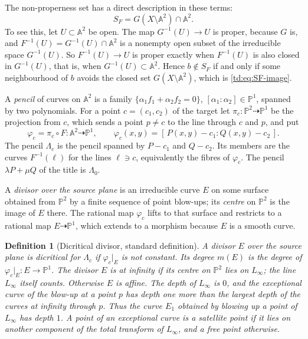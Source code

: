 \documentclass[a4paper,11pt]{article}
\theoremstyle{jsplain}
\theoremstyle{jsdef}
\newtheorem{definition}[theorem]{Definition}
\theoremstyle{jsrem}
\begin{document}
The non-properness set has a direct description in these terms:
\begin{equation}\label{td:eq:SF-image}
S_F = G(X \setminus \mathbb{A}^2) \cap \mathbb{A}^2 .
\end{equation}
To see this, let $U \subset \mathbb{A}^2$ be open. The map $G^{-1}(U) \to U$ is proper, because
$G$ is, and $F^{-1}(U) = G^{-1}(U) \cap \mathbb{A}^2$ is a nonempty open subset of the
irreducible space $G^{-1}(U)$. So $F^{-1}(U) \to U$ is proper exactly when $F^{-1}(U)$ is also
closed in $G^{-1}(U)$, that is, when $G^{-1}(U) \subset \mathbb{A}^2$. Hence $b \notin S_F$ if and
only if some neighbourhood of $b$ avoids the closed set $G(X \setminus \mathbb{A}^2)$, which is
\eqref{td:eq:SF-image}.

A \emph{pencil} of curves on $\mathbb{A}^2$ is a family $\{\alpha_1 f_1 + \alpha_2 f_2 = 0\}$,
$[\alpha_1 : \alpha_2] \in \mathbb{P}^1$, spanned by two polynomials. For a point
$c = (c_1, c_2)$ of the target let $\pi_c \colon \mathbb{P}^2 \dashrightarrow \mathbb{P}^1$ be
the projection from $c$, which sends a point $p \neq c$ to the line through $c$ and $p$, and put
\[
\varphi_c = \pi_c \circ F \colon \mathbb{A}^2 \dashrightarrow \mathbb{P}^1, \qquad
\varphi_c(x,y) = [\,P(x,y) - c_1 : Q(x,y) - c_2\,].
\]
The pencil $\Lambda_c$ is the pencil spanned by $P - c_1$ and $Q - c_2$. Its members are the
curves $F^{-1}(\ell)$ for the lines $\ell \ni c$, equivalently the fibres of $\varphi_c$. The
pencil $\lambda P + \mu Q$ of the title is $\Lambda_0$.

A \emph{divisor over the source plane} is an irreducible curve $E$ on some surface obtained from
$\mathbb{P}^2$ by a finite sequence of point blow-ups; its \emph{centre} on $\mathbb{P}^2$ is the
image of $E$ there. The rational map $\varphi_c$ lifts to that surface and restricts to a
rational map $E \dashrightarrow \mathbb{P}^1$, which extends to a morphism because $E$ is a
smooth curve.

\begin{definition}[Dicritical divisor, standard definition]\label{td:def:dicritical}
A divisor $E$ over the source plane is \emph{dicritical} for $\Lambda_c$ if $\varphi_c|_E$ is
not constant. Its \emph{degree} $m(E)$ is the degree of
$\varphi_c|_E \colon E \to \mathbb{P}^1$. The divisor $E$ is \emph{at infinity} if its centre on
$\mathbb{P}^2$ lies on $L_\infty$; the line $L_\infty$ itself counts. Otherwise $E$ is
\emph{affine}. The \emph{depth} of $L_\infty$ is $0$, and the exceptional curve of the blow-up
at a point $p$ has depth one more than the largest depth of the curves at infinity through $p$.
Thus the curve $E_1$ obtained by blowing up a point of $L_\infty$ has depth $1$. A point of an
exceptional curve is a \emph{satellite} point if it lies on another component of the total
transform of $L_\infty$, and a \emph{free} point otherwise.
\end{definition}
\end{document}
